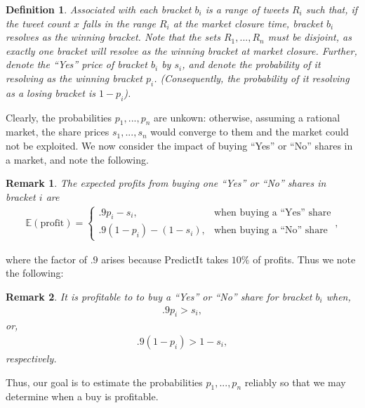 \documentclass{article}
\newtheorem*{remark}{Remark}
\newtheorem{definition}{Definition}
\begin{document}
\begin{definition}
    Associated with each bracket $b_i$ is a range of tweets $R_i$ such that, if the tweet count $x$ falls in the range $R_i$ at the market closure time,
    bracket $b_i$ resolves as the winning bracket. Note that the sets $R_1,...,R_n$ must be disjoint, as exactly one bracket will resolve as the winning bracket at market closure. Further, denote the ``Yes'' price of bracket $b_i$ by $s_i$, and denote the probability of it resolving as the winning bracket $p_i$.
    (Consequently, the probability of it resolving as a losing bracket is $1 - p_i$).
\end{definition}
Clearly, the probabilities $p_1,...,p_n$ are unkown: otherwise, assuming a rational market, the share prices $s_1,...,s_n$ would converge to them
and the market could not be exploited.
We now consider the impact of buying ``Yes'' or ``No'' shares in a market, and note the following.
\begin{remark}
    The expected profits from buying one ``Yes'' or ``No'' shares in bracket $i$ are
    \begin{align*}
        \mathbb{E}(\text{profit}) =
        \begin{cases}
            .9p_i - s_i, & \text{when buying a ``Yes'' share} \\
            .9(1-p_i) - (1-s_i), &\text{when buying a ``No'' share}
        \end{cases},
    \end{align*}
\end{remark}
\noindent where the factor of $.9$ arises because PredictIt takes $10\%$ of profits.
Thus we note the following:
\begin{remark}
It is profitable to to buy a ``Yes'' or ``No'' share for bracket
$b_i$ when,
\begin{align*}
    .9p_i > s_i,
\end{align*}
\noindent or,
\begin{align*}
    .9(1-p_i) > 1- s_i,
\end{align*}
\noindent respectively.
\end{remark}
Thus, our goal is to estimate the probabilities $p_1,...,p_n$ reliably so that we may determine when a buy is profitable.
\end{document}
